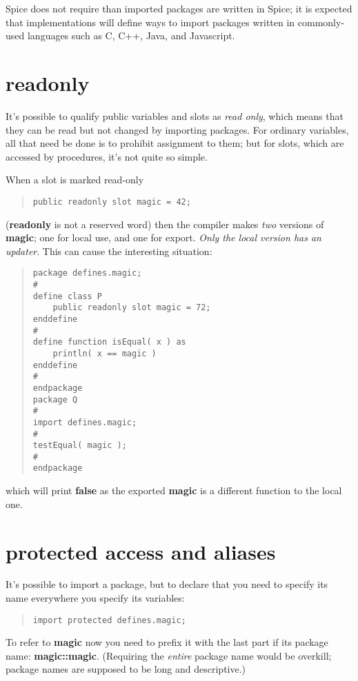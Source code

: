 \documentclass{report}
\begin{document}
Spice does not require than imported packages are written in Spice; it is
expected that implementations will define ways to import packages written in
commonly-used languages such as C, C++, Java, and Javascript.\section{readonly}


It's possible to qualify public variables and slots as {\em read only}, which
means that they can be read but not changed by importing packages. For ordinary
variables, all that need be done is to prohibit assignment to them; but
for slots, which are accessed by procedures, it's not quite so simple.

When a slot is marked read-only

\begin{quote}
\begin{verbatim}
public readonly slot magic = 42;
\end{verbatim}
\end{quote}
({\bf readonly} is not a reserved word) then the compiler makes {\em two} versions of
{\bf magic}; one for local use, and one for export. {\em Only the local version has an
updater}. This can cause the interesting situation:

\begin{quote}
\begin{verbatim}
package defines.magic;
#
define class P
    public readonly slot magic = 72;
enddefine
#
define function isEqual( x ) as
    println( x == magic )
enddefine
#
endpackage
package Q
#
import defines.magic;
#
testEqual( magic );
#
endpackage
\end{verbatim}
\end{quote}
which will print {\bf false} as the exported {\bf magic} is a different function to the
local one.\section{protected access and aliases}


It's possible to import a package, but to declare that you need to specify its
name everywhere you specify its variables:

\begin{quote}
\begin{verbatim}
import protected defines.magic;
\end{verbatim}
\end{quote}
To refer to {\bf magic} now you need to prefix it with the last part if its
package name: {\bf magic::magic}. (Requiring the {\em entire} package name would be
overkill; package names are supposed to be long and descriptive.)
\end{document}
